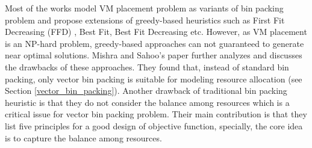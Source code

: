 \begin{table}[]
\centering
\caption{A Comparison of different models and approaches}
\label{vm-based-comparison}
\end{table}



Most of the works model VM placement problem as variants of bin packing problem and propose extensions of greedy-based heuristics such as First Fit Decreasing (FFD) \cite{Wood:2009fn}, Best Fit, Best Fit Decreasing \cite{Beloglazov:2010dt} etc. However, as VM placement is an NP-hard problem, greedy-based approaches can not guaranteed to generate near optimal solutions. Mishra and Sahoo's paper \cite{Mishra:2011bz} further analyzes and discusses the drawbacks of these approaches. They found that, instead of standard bin packing, only vector bin packing is suitable for modeling resource allocation (see Section \ref{vector_bin_packing}). Another drawback of traditional bin packing heuristic is that they do not consider the balance among resources which is a critical issue for vector bin packing problem. Their main contribution is that they list five principles for a good design of objective function, specially, the core idea is to capture the balance among resources.

